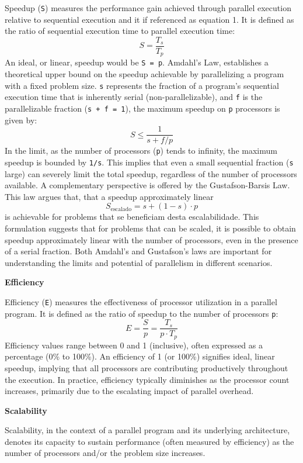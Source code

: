 Speedup (\texttt{S}) measures the performance gain achieved through parallel execution relative to sequential execution and it if referenced as equation 1. It is defined as the ratio of sequential execution time to parallel execution time:
\[ S = \frac{T_s}{T_p} \]
An ideal, or linear, speedup would be \texttt{S = p}. Amdahl's Law, establishes a theoretical upper bound on the speedup achievable by parallelizing a program with a fixed problem size. \texttt{s} represents the fraction of a program's sequential execution time that is inherently serial (non-parallelizable), and \texttt{f} is the parallelizable fraction (\texttt{s + f = 1}), the maximum speedup on \texttt{p} processors is given by:
\[ S \leq \frac{1}{s + f/p} \]
In the limit, as the number of processors (\texttt{p}) tends to infinity, the maximum speedup is bounded by \texttt{1/s}. This implies that even a small sequential fraction (\texttt{s} large) can severely limit the total speedup, regardless of the number of processors available. A complementary perspective is offered by the Gustafson-Barsis Law. This law argues that, that a speedup approximately linear
\[ S_{\text{escalado}} = s + (1-s) \cdot p \]
is achievable for problems that se beneficiam desta escalabilidade. This formulation suggests that for problems that can be scaled, it is possible to obtain speedup approximately linear with the number of processors, even in the presence of a serial fraction. Both Amdahl's and Gustafson's laws are important for understanding the limits and potential of parallelism in different scenarios.

\textbf{Efficiency}

Efficiency (\texttt{E}) measures the effectiveness of processor utilization in a parallel program. It is defined as the ratio of speedup to the number of processors \texttt{p}:
\[ E = \frac{S}{p} = \frac{T_s}{p \cdot T_p} \]
Efficiency values range between 0 and 1 (inclusive), often expressed as a percentage (0\% to 100\%). An efficiency of 1 (or 100\%) signifies ideal, linear speedup, implying that all processors are contributing productively throughout the execution. In practice, efficiency typically diminishes as the processor count increases, primarily due to the escalating impact of parallel overhead.

\textbf{Scalability}

Scalability, in the context of a parallel program and its underlying architecture, denotes its capacity to sustain performance (often measured by efficiency) as the number of processors and/or the problem size increases.

